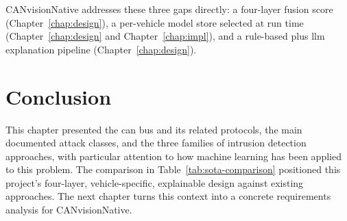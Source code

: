 CANvisionNative addresses these three gaps directly: a four-layer fusion score (Chapter~\ref{chap:design}), a per-vehicle model store selected at run time (Chapter~\ref{chap:design} and Chapter~\ref{chap:impl}), and a rule-based plus \gls{llm} explanation pipeline (Chapter~\ref{chap:design}).

\section{Conclusion}

This chapter presented the \gls{can} bus and its related protocols, the main documented attack classes, and the three families of intrusion detection approaches, with particular attention to how machine learning has been applied to this problem. The comparison in Table~\ref{tab:sota-comparison} positioned this project's four-layer, vehicle-specific, explainable design against existing approaches. The next chapter turns this context into a concrete requirements analysis for CANvisionNative.
